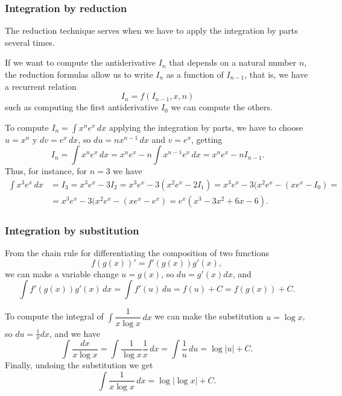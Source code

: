 \begin{frame}
\frametitle{Integration by reduction}
The reduction technique serves when we have to apply the integration by parts several times. 

If we want to compute the antiderivative $I_{n}$ that depends on a natural number $n$, the reduction formulas allow us to write $I_{n}$ as a function of $I_{n-1}$, that is, we have a recurrent relation
\[
\ I_{n}=f(I_{n-1},x,n)
\]
such as computing the first antiderivative $I_0$ we can compute the others.

 To compute $I_{n}=\int{x^ne^x}\,dx$ applying the integration by parts, we have to choose $u=x^n$ y $dv=e^x\,dx$, so $du=nx^{n-1}\,dx$ and $v=e^{x}$, getting
\[
\ I_{n}=\int{x^ne^x}\,dx=x^ne^x-n\int{x^{n-1}e^x}\,dx=x^ne^x-nI_{n-1}.
\]
Thus, for instance, for $n=3$ we have
\begin{align*}
\int x^3 e^x\, dx &= I_3 = x^3e^x-3I_2 = x^3e^x-3(x^2e^x-2I_1) = x^3e^x-3(x^2e^x-(xe^x-I_0) =\\
&= x^3e^x-3(x^2e^x-(xe^x-e^x) = e^x(x^3-3x^2+6x-6).
\end{align*}
\end{frame}


\begin{frame}
\frametitle{Integration by substitution}
From the chain rule for differentiating the composition of two functions 
\[
f(g(x))' = f'(g(x))g'(x),
\]
we can make a variable change $u=g(x)$, so $du=g'(x)dx$, and
\[
\int f'(g(x))g'(x)\, dx = \int f'(u)\, du = f(u)+C = f(g(x))+C.
\]

 To compute the integral of $\int{\dfrac{1}{x\log x}}\, dx$ we can make the substitution 
$u=\log x$, so $du=\frac{1}{x}dx$, and we have
\[
\int \frac{dx}{x\log x}=\int \frac{1}{\log x}\frac{1}{x}\,dx = \int \frac{1}{u}\,du = \log |u|+ C.
\]
Finally, undoing the substitution we get 
\[
\int \frac{1}{x\log x}\,dx= \log |\log x| + C.
\]
\end{frame}


